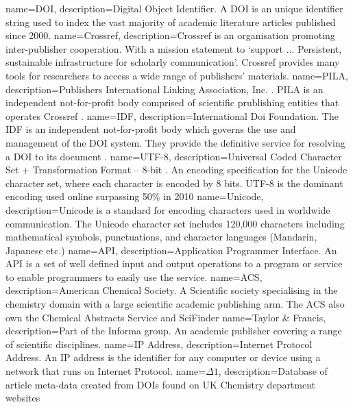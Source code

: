 {
name={DOI},
description={Digital Object Identifier. A DOI is an unique identifier string used to index the vast majority of academic literature articles published since 2000.\cite{glossarydoi}} 
}
{
name={Crossref},
description={Crossref is an organisation promoting inter-publisher cooperation. With a mission statement to `support ... Persistent, sustainable infrastructure for scholarly communication'\cite{crossref-formation}. Crossref provides many tools for researchers to access a wide range of publishers' materials.} 
}
{
name={PILA},
description={Publishers International Linking Association, Inc. . PILA is an independent not-for-profit body comprised of scientific prublishing entities that operates Crossref \cite{crossref-formation}. } 
}
{ 
name={IDF},
description={International Doi Foundation. The IDF is an independent not-for-profit body which governs the use and management of the DOI system. They provide the definitive service for resolving a DOI to its document \cite{doi_handbook2}.} 
}
{
name={UTF-8},
description={Universal Coded Character Set + Transformation Format – 8-bit \cite{utf8}. An encoding specification for the Unicode character set, where each character is encoded by 8 bits. UTF-8 is the dominant encoding used online surpassing 50\% in 2010\cite{utf8stats}} 
}
{
name={Unicode},
description={Unicode is a standard for encoding characters used in worldwide communication. The Unicode character set includes 120,000 characters including mathematical symbols, punctuations, and character languages (Mandarin, Japanese etc.)} 
}
{
name={API},
description={Application Programmer Interface. An API is a set of well defined input and output operations to a program or service to enable programmers to easily use the service.} 
}
{
name={ACS},
description={American Chemical Society. A Scientific society specialising in the chemistry domain with a large scientific academic publishing arm. The ACS also own the Chemical Abstracts Service and SciFinder\textsuperscript{\textregistered}} 
}
{
name={Taylor \& Francis},
description={Part of the Informa group. An academic publisher covering a range of scientific disciplines.} 
}
{
name={IP Address},
description={Internet Protocol Address. An IP address is the identifier for any computer or device using a network that runs on Internet Protocol.} 
}
{
name={$\Delta1$},
description={Database of article meta-data created from DOIs found on UK Chemistry department websites} 
}
